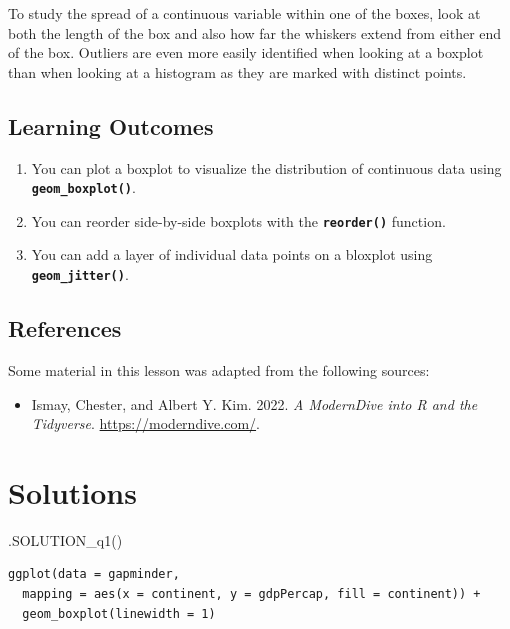 \documentclass[
  letterpaper,
  DIV=11,
  numbers=noendperiod]{scrreprt}
\newenvironment{Shaded}{\begin{snugshade}}{\end{snugshade}}
\newcommand{\FunctionTok}[1]{\textcolor[rgb]{0.28,0.35,0.67}{#1}}
\newcommand{\NormalTok}[1]{\textcolor[rgb]{0.00,0.23,0.31}{#1}}
\providecommand{\tightlist}{%
  \setlength{\itemsep}{0pt}\setlength{\parskip}{0pt}}\usepackage{longtable,booktabs,array}
\begin{document}
To study the spread of a continuous variable within one of the boxes,
look at both the length of the box and also how far the whiskers extend
from either end of the box. Outliers are even more easily identified
when looking at a boxplot than when looking at a histogram as they are
marked with distinct points.

\subsection{Learning Outcomes}\label{learning-outcomes-1}

\begin{enumerate}
\def\labelenumi{\arabic{enumi}.}
\tightlist
\item
  You can plot a boxplot to visualize the distribution of continuous
  data using \textbf{\texttt{geom\_boxplot()}}.
\item
  You can reorder side-by-side boxplots with the
  \textbf{\texttt{reorder()}} function.
\item
  You can add a layer of individual data points on a bloxplot using
  \textbf{\texttt{geom\_jitter()}}.
\end{enumerate}

\subsection*{References}\label{references-16}

Some material in this lesson was adapted from the following sources:

\begin{itemize}
\tightlist
\item
  Ismay, Chester, and Albert Y. Kim. 2022. \emph{A ModernDive into R and
  the Tidyverse}. \url{https://moderndive.com/}.
\end{itemize}

\section{Solutions}\label{solutions-13}

\begin{Shaded}
\begin{Highlighting}[]
\FunctionTok{.SOLUTION\_q1}\NormalTok{()}
\end{Highlighting}
\end{Shaded}

\begin{verbatim}
ggplot(data = gapminder,
  mapping = aes(x = continent, y = gdpPercap, fill = continent)) +
  geom_boxplot(linewidth = 1)
\end{verbatim}
\end{document}
